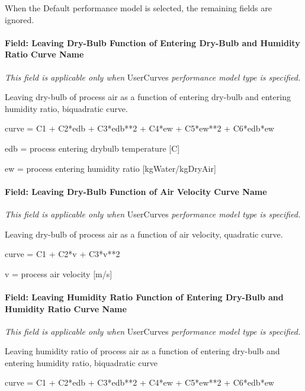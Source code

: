 When the Default performance model is selected, the remaining fields are ignored.

\paragraph{Field: Leaving Dry-Bulb Function of Entering Dry-Bulb and Humidity Ratio Curve Name}\label{field-leaving-dry-bulb-function-of-entering-dry-bulb-and-humidity-ratio-curve-name}

\emph{This field is applicable only when} UserCurves \emph{performance model type is specified.}

Leaving dry-bulb of process air as a function of entering dry-bulb and entering humidity ratio, biquadratic curve.

curve = C1 + C2*edb + C3*edb**2 + C4*ew + C5*ew**2 + C6*edb*ew

edb = process entering drybulb temperature {[}C{]}

ew = process entering humidity ratio {[}kgWater/kgDryAir{]}

\paragraph{Field: Leaving Dry-Bulb Function of Air Velocity Curve Name}\label{field-leaving-dry-bulb-function-of-air-velocity-curve-name}

\emph{This field is applicable only when} UserCurves \emph{performance model type is specified.}

Leaving dry-bulb of process air as a function of air velocity, quadratic curve.

curve = C1 + C2*v + C3*v**2

v = process air velocity {[}m/s{]}

\paragraph{Field: Leaving Humidity Ratio Function of Entering Dry-Bulb and Humidity Ratio Curve Name}\label{field-leaving-humidity-ratio-function-of-entering-dry-bulb-and-humidity-ratio-curve-name}

\emph{This field is applicable only when} UserCurves \emph{performance model type is specified.}

Leaving humidity ratio of process air as a function of entering dry-bulb and entering humidity ratio, biquadratic curve

curve = C1 + C2*edb + C3*edb**2 + C4*ew + C5*ew**2 + C6*edb*ew

